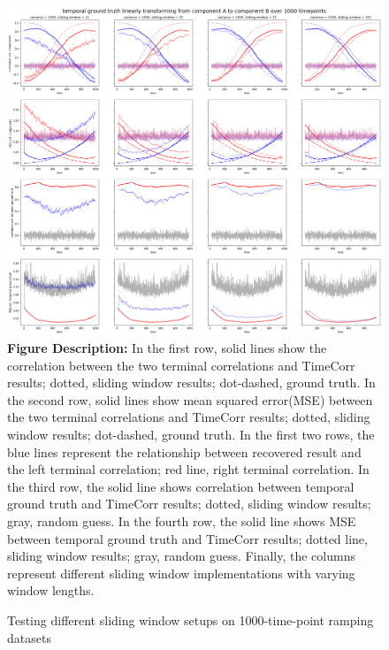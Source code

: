 \documentclass[11pt]{article}
\begin{document}
\begin{figure}[H]
\caption{Testing different sliding window setups on 1000-time-point ramping datasets}
\includegraphics[width=1\textwidth]{../figures/SyntheticTesting/ramp1000t4slide.png}
\label{fig:ramp1000t4slide}
\small{\textbf{Figure Description:} In the first row, solid lines show the correlation between the two terminal correlations and TimeCorr results; dotted, sliding window results; dot-dashed, ground truth. In the second row, solid lines show mean squared error(MSE) between the two terminal correlations and TimeCorr results; dotted, sliding window results; dot-dashed, ground truth. In the first two rows, the blue lines represent the relationship between recovered result and the left terminal correlation; red line, right terminal correlation. In the third row, the solid line shows correlation between temporal ground truth and TimeCorr results; dotted, sliding window results; gray, random guess. In the fourth row, the solid line shows MSE between temporal ground truth and TimeCorr results; dotted line, sliding window results; gray, random guess. Finally, the columns represent different sliding window implementations with varying window lengths.}
\end{figure}
\end{document}
